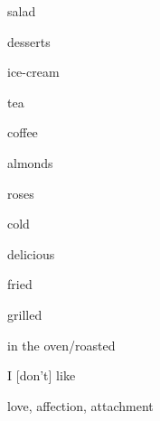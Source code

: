 \begin{flashcard}{\LARGE salad}
\LARGE {}
\end{flashcard}
\begin{flashcard}{\LARGE desserts}
\LARGE {}
\end{flashcard}
\begin{flashcard}{\LARGE ice-cream}
\LARGE {}
\end{flashcard}
\begin{flashcard}{\LARGE tea}
\LARGE {}
\end{flashcard}
\begin{flashcard}{\LARGE coffee}
\LARGE {}
\end{flashcard}
\begin{flashcard}{\LARGE almonds}
\LARGE {}
\end{flashcard}
\begin{flashcard}{\LARGE roses}
\LARGE {}
\end{flashcard}
\begin{flashcard}{\LARGE cold}
\LARGE {}
\end{flashcard}
\begin{flashcard}{\LARGE delicious}
\LARGE {}
\end{flashcard}
\begin{flashcard}{\LARGE fried}
\LARGE {}
\end{flashcard}
\begin{flashcard}{\LARGE grilled}
\LARGE {}
\end{flashcard}
\begin{flashcard}{\LARGE in the oven/roasted}
\LARGE {}
\end{flashcard}
\begin{flashcard}{\LARGE I {[}don't{]} like}
\LARGE {}
\end{flashcard}
\begin{flashcard}{\LARGE love, affection, attachment}
\LARGE {}
\end{flashcard}
